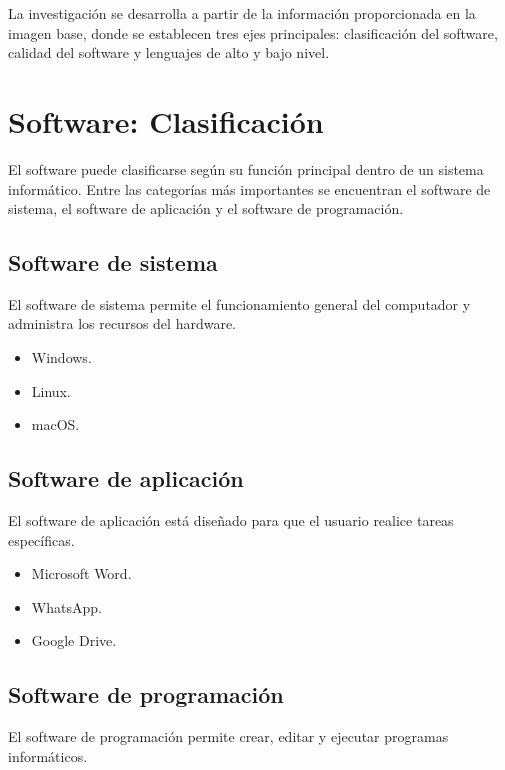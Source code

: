 \documentclass[12pt,a4paper]{article}
\begin{document}
	La investigación se desarrolla a partir de la información proporcionada en la imagen base, donde se establecen tres ejes principales: clasificación del software, calidad del software y lenguajes de alto y bajo nivel.
	
	\section{Software: Clasificación}
	
	El software puede clasificarse según su función principal dentro de un sistema informático. Entre las categorías más importantes se encuentran el software de sistema, el software de aplicación y el software de programación.
	
	\subsection{Software de sistema}
	
	El software de sistema permite el funcionamiento general del computador y administra los recursos del hardware.
	
	\begin{itemize}
		\item Windows.
		\item Linux.
		\item macOS.
	\end{itemize}
	
	\subsection{Software de aplicación}
	
	El software de aplicación está diseñado para que el usuario realice tareas específicas.
	
	\begin{itemize}
		\item Microsoft Word.
		\item WhatsApp.
		\item Google Drive.
	\end{itemize}
	
	\subsection{Software de programación}
	
	El software de programación permite crear, editar y ejecutar programas informáticos.
	
\end{document}
